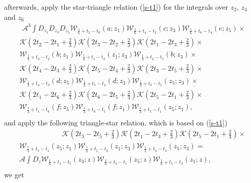 \documentclass[a4paper,11pt]{article}%
\numberwithin{equation}{section}
\begin{document}
 afterwards, apply the star-triangle relation (\ref{s-t1}) for the integrals over  $z_2$,  $z_4$ and $z_6$
  \begin{multline}\label{wp}
   \,\,\mathcal{A}^3 \int D_{z_1} D_{z_3}D_{z_5}  \mathcal{W}_{\frac{1}{6}+t_2-t_6}(a;z_1) \mathcal{W}_{\frac{1}{6}+t_4-t_2}(c;z_3) \mathcal{W}_{\frac{1}{6}+t_6-t_4}(e; z_5) \times
  \\ 
  \mathcal{K}(2t_2-2t_1+\frac{2}{3})  \mathcal{K}(2t_3-2t_2+\frac{2}{3}) \mathcal{K}(2t_1-2t_3+\frac{2}{3})  
   \times \,\qquad\\
    \mathcal{W}_{\frac{1}{3}+t_3-t_2}(b; z_1) \mathcal{W}_{\frac{1}{3}+t_1-t_3}(z_1;z_3) \mathcal{W}_{\frac{1}{3}+t_2-t_1}(b;z_3) \times\,\,\,\,\\
  \mathcal{K}(2t_4-2t_3+\frac{2}{3}) \mathcal{K}(2t_5-2t_4+\frac{2}{3}) \mathcal{K}(2t_3-2t_5+\frac{2}{3}) 
  \times \qquad \\  
 \mathcal{W}_{\frac{1}{3}+t_4-t_3}(d;z_5) \mathcal{W}_{\frac{1}{3}+t_5-t_4}(d;z_3) \mathcal{W}_{\frac{1}{3}+t_3-t_5}(z_5; z_3) \times\,\,\,\,\\
  \mathcal{K}(2t_1-2t_6+\frac{2}{3}) \mathcal{K}(2t_6-2t_5+\frac{2}{3}) \mathcal{K}(2t_5-2t_1+\frac{2}{3}) \times\qquad\\
  \mathcal{W}_{\frac{1}{3}+t_1-t_6} (f;z_5) \mathcal{W}_{\frac{1}{3}+t_6-t_5}(f; z_1)
   \mathcal{W}_{\frac{1}{3}+t_5-t_1}(z_5; z_1),\\
 \end{multline}
 and apply the following triangle-star relation, which is  based on  (\ref{s-t1})
  \begin{multline}\label{wp}
  \qquad \qquad \qquad \mathcal{K}(2t_3-2t_5+\frac{2}{3})\mathcal{K}(2t_1-2t_3+\frac{2}{3})\mathcal{K}(2t_5-2t_1+\frac{2}{3})\times \\
   \mathcal{W}_{\frac{1}{3}+t_5-t_1}(z_5;z_1)  
   \mathcal{W}_{\frac{1}{3}+t_1-t_3}(z_1; z_3)   \mathcal{W}_{\frac{1}{3}+t_3-t_5}(z_5; z_3) =\qquad\\
    \mathcal{A} \int D_z \mathcal{W}_{\frac{1}{6}+t_1-t_5}(z_3; z) \mathcal{W}_{\frac{1}{6}+t_3-t_1}(z_5; z) \mathcal{W}_{\frac{1}{6}+t_5-t_3}(z_1; z),\qquad\,\\
 \end{multline}
 we get 
\end{document}
